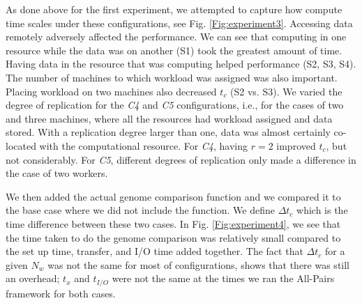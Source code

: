 \documentclass{rspublic}
\begin{document}
As done above for the first experiment, we attempted to capture how
compute time scales under these configurations, see Fig.
\ref{Fig:experiment3}. Accessing data remotely adversely affected the
performance. We can see that computing in one resource while the data
was on another (S1) took the greatest amount of time. Having data in the
resource that was computing helped performance (S2, S3, S4). The number
of machines to which workload was assigned was also important. Placing
workload on two machines also decreased $t_c$ (S2 vs. S3). We varied the
degree of replication for the \textit{C4} and \textit{C5} configurations, i.e., for
the cases of two and three machines, where all the resources had
workload assigned and data stored. With a replication degree larger than
one, data was almost certainly co-located with the computational
resource. For \textit{C4}, having $r = 2$ improved $t_c$, but not considerably.
For \textit{C5}, different degrees of replication only made a difference in the
case of two workers.

We then added the actual genome comparison function and we compared it
to the base case where we did not include the function. We define $\Delta t_c$
which is the time difference between these two cases. In Fig.
\ref{Fig:experiment4}, we see that the time taken to do the genome
comparison was relatively small compared to the set up time, transfer,
and I/O time added together. The fact that $\Delta t_c$ for a given
$N_w$ was not the same for most of configurations, shows that there was
still an overhead; $t_x$ and $t_{I/O}$ were not the same at the
times we ran the All-Pairs framework for both cases.
\end{document}
